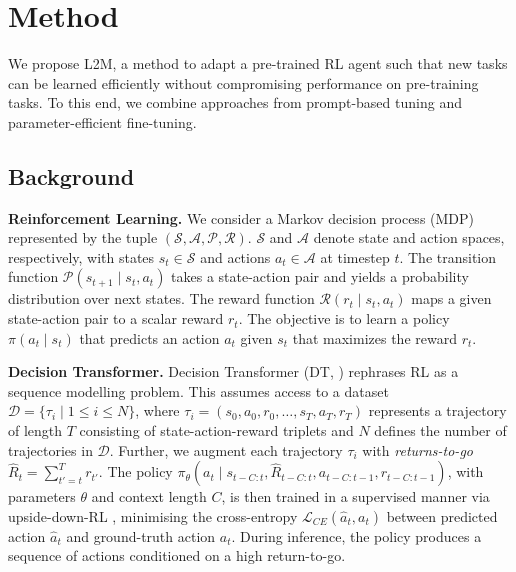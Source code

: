 \documentclass{article}
\begin{document}
\section{Method}\label{sec:method}

We propose L2M, a method to adapt a pre-trained RL agent such that new tasks can be learned efficiently without compromising performance on pre-training tasks.
To this end, we combine approaches from prompt-based tuning and parameter-efficient fine-tuning.

\subsection{Background} 

\textbf{Reinforcement Learning.} We consider a Markov decision process (MDP) represented by the tuple  $(\mathcal{S},\mathcal{A},\mathcal{P},\mathcal{R})$. 
$\mathcal{S}$ and $\mathcal{A}$ denote state and action spaces, respectively, with states $s_t \in \mathcal{S}$ and actions $a_t \in \mathcal{A}$ at timestep $t$. 
The transition function $\mathcal{P}(s_{t+1}\mid s_t, a_t)$ takes a state-action pair and yields a probability distribution over next states. 
The reward function $\mathcal{R}(r_t \mid s_t, a_t)$ maps a given state-action pair to a scalar reward $r_t$.
The objective is to learn a policy $\pi(a_t\mid s_t)$ that predicts an action $a_t$ given $s_t$ that maximizes the reward $r_t$.

\textbf{Decision Transformer.} Decision Transformer (DT, \citealp{Chen:21}) rephrases RL as a sequence modelling problem.
This assumes access to a dataset $\mathcal{D}=\{\tau_i \mid 1 \leq i \leq N \}$, where $\tau_i=(s_0, a_0, r_0, \ldots, s_T, a_T, r_T)$ represents a trajectory of length $T$ consisting of state-action-reward triplets and $N$ defines the number of trajectories in $\mathcal{D}$. 
Further, we augment each trajectory $\tau_i$ with \emph{returns-to-go} $\hat R_t=\sum_{t'=t}^T r_{t'}$.
The policy $\pi_{\theta} (a_t \mid s_{t-C: t}, \hat R_{t-C:t}, a_{t-C:t-1}, r_{t-C:t-1})$, with parameters $\theta$ and context length $C$, is then trained in a supervised manner via upside-down-RL \citep{Schmidhuber:19}, minimising the cross-entropy $\mathcal{L}_{CE}(\hat{a}_t, a_t)$ between predicted action $\hat{a}_t$ and ground-truth action $a_t$.  
During inference, the policy produces a sequence of actions conditioned on a high return-to-go.
\end{document}

